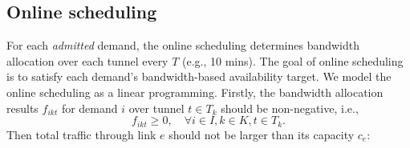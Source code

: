 \documentclass[sigconf]{acmart}
\begin{document}







\subsection{Online scheduling} \label{TE}

For each \textit{admitted} demand, the online scheduling determines bandwidth allocation over each tunnel every $T$ (e.g., 10 mins).
The goal of online scheduling is to satisfy each demand's bandwidth-based availability target.
We model the online scheduling as a linear programming.
Firstly, the bandwidth allocation results $f_{ikt}$ for demand $i$ over tunnel $t \in T_{k}$ should be non-negative, i.e.,
\begin{equation}
f_{ikt} \ge 0, \quad\forall i \in I ,  k\in K,   t\in T_{k}.
\label{constraint-f2}
\end{equation}
Then total traffic through link $e$ should not be larger than its capacity $c_e$:
\end{document}
